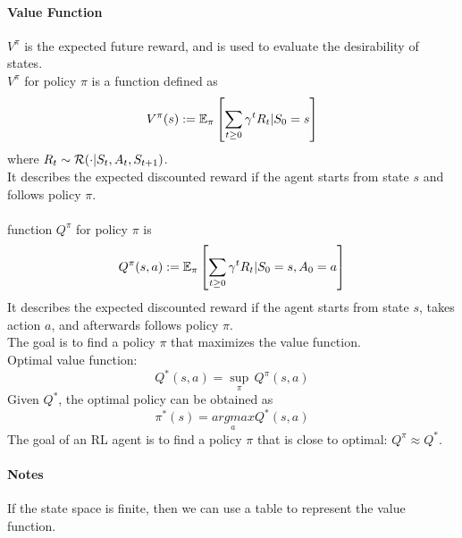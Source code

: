 \documentclass[11pt]{article}
\begin{document}
\paragraph{Value Function}
 $V^\pi$ is the expected future reward, and is used to evaluate the desirability of states. \\
 $V^\pi$ for policy $\pi$ is a function defined as
$$V^{\pi}(s) := \mathbb{E}_\pi\left[ \sum_{t \geq 0} \gamma^t R_t | S_0=s \right ]$$ where $R_t \sim \mathcal{R}(\cdot | S_t, A_t, S_{t+1})$.\\
It describes the expected discounted reward if the agent starts from state $s$ and follows policy $\pi$.\\
\\
 function $Q^\pi$ for policy $\pi$ is 
$$Q^\pi(s,a) := \mathbb{E}_\pi\left[ \sum_{t \geq 0} \gamma^tR_t | S_0=s, A_0 = a\right ]$$
It describes the expected discounted reward if the agent starts from state $s$, takes action $a$, and afterwards follows policy $\pi$. \\
The goal is to find a policy $\pi$ that maximizes the value function. \\
Optimal value function:
$$Q^*(s,a) = \underset{\pi}{\sup} \, Q^\pi (s,a)$$
Given $Q^*$, the optimal policy can be obtained as 
$$\pi^*(s) = \underset{a}{argmax}Q^*(s,a)$$
The goal of an RL agent is to find a policy $\pi$ that is close to optimal: $Q^\pi \approx Q^*$.

\paragraph{Notes}
If the state space is finite, then we can use a table to represent the value function.
\end{document}
